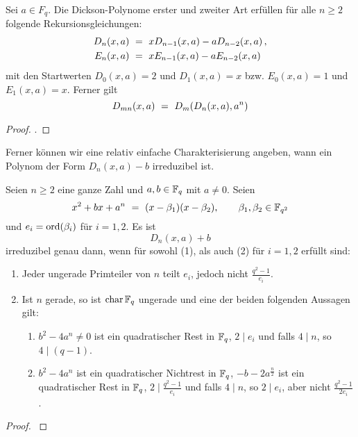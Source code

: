 \begin{proposition}
  \label{satz:dickson_2}
  Sei $a \in F_q$. Die Dickson-Polynome erster und zweiter Art 
  erfüllen für alle $n\geq 2$ folgende Rekursionsgleichungen:
  \begin{align*}
    D_n(x,a) &\ =\  xD_{n-1}(x,a) - a D_{n-2}(x,a) \,, \\
    E_n(x,a) &\ =\  xE_{n-1}(x,a) - a E_{n-2}(x,a)
  \end{align*}
  mit den Startwerten $D_0(x,a) = 2$ und $D_1(x,a)=x$ bzw.
  $E_0(x,a) = 1$ und $E_1(x,a) = x$. Ferner gilt
  \[ D_{mn}(x,a) \ =\  D_m(D_n(x,a),a^n)\]
\end{proposition}
\begin{proof}
  \autocites[Lemma 2.3, Lemma 2.6 (i)]{lidl1993dickson}.
\end{proof}

Ferner können wir eine  relativ einfache Charakterisierung angeben, wann ein
Polynom der Form $D_n(x,a)-b$ irreduzibel ist.

\begin{proposition}
  \label{satz:dickson_irred}
  Seien $n\geq 2$ eine ganze Zahl und $a,b \in \mathbb{F}_q$ mit $a \neq 0$.
  Seien
  \[ x^2 + bx +a^n \ =\  (x-\beta_1)(x-\beta_2), \qquad 
    \beta_1,\beta_2 \in \mathbb{F}_{q^2}\]
  und $e_i = \operatorname{ord}(\beta_i)$ für $i=1,2$. Es ist
  \[ D_n(x,a) + b \]
  irreduzibel genau dann, wenn für sowohl (1), als auch (2) für $i=1,2$ erfüllt
  sind:
  \begin{enumerate}
    \item Jeder ungerade Primteiler von $n$ teilt $e_i$, jedoch nicht
      $\tfrac{q^2-1}{e_i}$.
    \item Ist $n$ gerade, so ist $\operatorname{char} \mathbb{F}_q$ ungerade und eine der beiden
      folgenden Aussagen gilt:
      \begin{enumerate}[label=(\arabic*')]
        \item $b^2-4a^n \neq 0$ ist ein quadratischer Rest in $\mathbb{F}_q$, $2\mid e_i$
          und falls $4\mid n$, so $4 \mid (q-1)$.
        \item $b^2-4a^n$ ist ein quadratischer Nichtrest in $\mathbb{F}_q$,
          $-b-2a^\frac n 2$ ist ein quadratischer Rest in $\mathbb{F}_q$, 
          $2 \mid \tfrac{q^2-1}{e_i}$ und falls $4\mid n$, so $2\mid e_i$, 
          aber nicht $\tfrac{q^2-1}{2e_i}$.
      \end{enumerate}
  \end{enumerate}
\end{proposition}
\begin{proof}
  \autocite[Theorem 4]{gao1994}
\end{proof}


